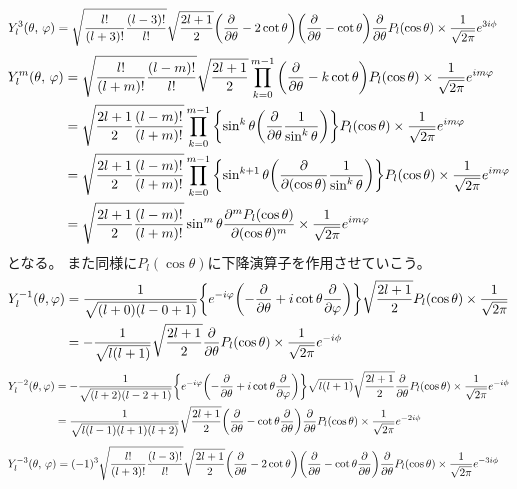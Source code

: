 \documentclass[../../master.tex]{subfiles}
\begin{document}
\begin{align}
	Y_l^3(\theta,\,\varphi)
	 & =\sqrt{\frac{l!}{(l+3)!}\frac{(l-3)!}{l!}}\sqrt{\frac{2l+1}{2}}\qty(\pdv{\theta}-2\cot\theta)\qty(\pdv{\theta}-\cot\theta)\pdv{\theta}P_l(\cos\theta)\times\frac{1}{\sqrt{2\pi}}e^{3i\phi}
\end{align}
\begin{align}
	Y_l^m(\theta,\,\varphi)
	 & =\sqrt{\frac{l!}{(l+m)!}\frac{(l-m)!}{l!}}\sqrt{\frac{2l+1}{2}} \prod_{k=0}^{m-1}\qty(\pdv{\theta}-k\cot\theta)P_l(\cos\theta)\times\frac{1}{\sqrt{2\pi}}e^{im\varphi}         \\
	 & =\sqrt{\frac{2l+1}{2}\frac{(l-m)!}{(l+m)!}} \prod_{k=0}^{m-1}\qty{\sin^k\theta\qty(\pdv{\theta}\frac{1}{\sin^k\theta})}P_l(\cos\theta)\times\frac{1}{\sqrt{2\pi}}e^{im\varphi} \\
	 & =\sqrt{\frac{2l+1}{2}\frac{(l-m)!}{(l+m)!}} \prod_{k=0}^{m-1}\qty{\sin^{k+1}\theta\qty(\pdv{(\cos\theta)}\frac{1}{\sin^k\theta})}P_l(\cos\theta)\times\frac{1}{\sqrt{2\pi}}e^{im\varphi} \\
	 & =\sqrt{\frac{2l+1}{2}\frac{(l-m)!}{(l+m)!}} \sin^{m}\theta\pdv[m]{P_l(\cos\theta)}{(\cos\theta)}\times\frac{1}{\sqrt{2\pi}}e^{im\varphi}
\end{align}
となる。
また同様に\(P_l(\cos\theta)\)に下降演算子を作用させていこう。
\begin{align}
	Y_l^{-1}(\theta,\varphi)
	 & = \frac{1}{\sqrt{(l+0)(l-0+1)}}\qty{e^{-i\varphi}\qty(-\pdv{\theta}+i\cot\theta\pdv{\varphi})}\sqrt{\frac{2l+1}{2}}P_l(\cos\theta)\times\frac{1}{\sqrt{2\pi}} \\
	 & =	-\frac{1}{\sqrt{l(l+1)}}\sqrt{\frac{2l+1}{2}}\pdv{\theta}P_l(\cos\theta)\times\frac{1}{\sqrt{2\pi}}e^{-i\phi}
\end{align}
\begin{align}
	Y_l^{-2}(\theta,\varphi)
	 & =-\frac{1}{\sqrt{(l+2)(l-2+1)}}\qty{e^{-i\varphi}\qty(-\pdv{\theta}+i\cot\theta\pdv{\varphi})}\sqrt{l(l+1)}\sqrt{\frac{2l+1}{2}}\pdv{\theta}P_l(\cos\theta)\times\frac{1}{\sqrt{2\pi}}e^{-i\phi} \\
	 & =\frac{1}{\sqrt{l(l-1)(l+1)(l+2)}}\sqrt{\frac{2l+1}{2}}\qty(\pdv{\theta}-\cot\theta\pdv{\theta})\pdv{\theta}P_l(\cos\theta)\times\frac{1}{\sqrt{2\pi}}e^{-2i\phi}
\end{align}
\begin{align}
	Y_l^{-3}(\theta,\,\varphi)
	 & =(-1)^3\sqrt{\frac{l!}{(l+3)!}\frac{(l-3)!}{l!}}\sqrt{\frac{2l+1}{2}}\qty(\pdv{\theta}-2\cot\theta)\qty(\pdv{\theta}-\cot\theta\pdv{\theta})\pdv{\theta}P_l(\cos\theta)\times\frac{1}{\sqrt{2\pi}}e^{-3i\phi}
\end{align}
\end{document}
